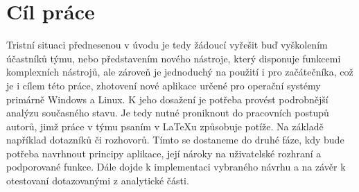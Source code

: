 \chapter{Cíl práce}
Tristní situaci přednesenou v úvodu je tedy žádoucí vyřešit buď vyškolením účastníků týmu, nebo představením nového nástroje, který disponuje funkcemi komplexních nástrojů, ale zároveň je jednoduchý na použití i pro začátečníka, což je i cílem této práce, zhotovení nové aplikace určené pro operační systémy primárně Windows a Linux. K jeho dosažení je potřeba provést podrobnější analýzu současného stavu. Je tedy nutné proniknout do pracovních postupů autorů, jimž práce v týmu psaním v LaTeXu způsobuje potíže. Na základě například dotazníků či rozhovorů. Tímto se dostaneme do druhé fáze, kdy bude potřeba navrhnout principy aplikace, její nároky na uživatelské rozhraní a podporované funkce. Dále dojde k implementaci vybraného návrhu a na závěr k otestovaní dotazovanými z analytické části.

